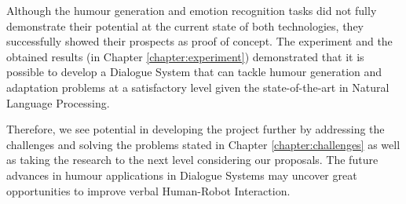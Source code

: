 Although the humour generation and emotion recognition tasks did not fully demonstrate their potential at the current state of both technologies, they successfully showed their prospects as proof of concept. The experiment and the obtained results (in Chapter \ref{chapter:experiment}) demonstrated that it is possible to develop a Dialogue System that can tackle humour generation and adaptation problems at a satisfactory level given the state-of-the-art in Natural Language Processing. 

Therefore, we see potential in developing the project further by addressing the challenges and solving the problems stated in Chapter \ref{chapter:challenges} as well as taking the research to the next level considering our proposals. The future advances in humour applications in Dialogue Systems may uncover great opportunities to improve verbal Human-Robot Interaction.